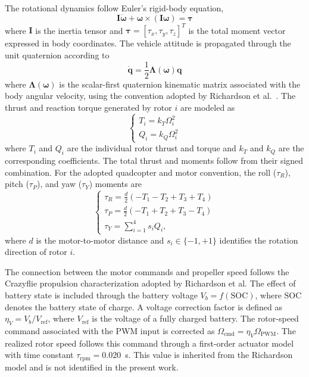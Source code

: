\documentclass[journal]{IEEEtran}
\begin{document}
The rotational dynamics follow Euler's rigid-body equation,
%
\begin{equation}
\mathbf{I}\dot{\boldsymbol{\omega}}
+
\boldsymbol{\omega}
\times
(\mathbf{I}\boldsymbol{\omega})
= \boldsymbol{\tau}
\label{eq_vehicle_rot}
\end{equation}
where $\mathbf{I}$ is the inertia tensor and $\boldsymbol{\tau}=[\tau_x,\tau_y,\tau_z]^T$ is the total moment vector expressed in body coordinates.
%
The vehicle attitude is propagated through the unit quaternion according to
%
\begin{equation}
\dot{\mathbf q} = \frac{1}{2}
\mathbf{\Lambda}(\boldsymbol{\omega})\mathbf q
\label{eq_vehicle_attitude}
\end{equation}
where $\mathbf{\Lambda}(\boldsymbol{\omega})$ is the scalar-first quaternion kinematic matrix associated with the body angular velocity, using the convention adopted by Richardson et al.~\cite{Richardson2025}.
%
The thrust and reaction torque generated by rotor $i$ are modeled as
%
\begin{equation}
\begin{cases}
{T_i=k_T\Omega_i^2}\\
{Q_i=k_Q\Omega_i^2}
\end{cases}
\label{eq_T_and_Q}
\end{equation}
where $T_i$ and $Q_i$ are the individual rotor thrust and torque and $k_T$ and $k_Q$ are the corresponding coefficients. The total thrust and moments follow from their signed combination.
%
For the adopted quadcopter and motor convention, the roll ($\tau_R$), pitch ($\tau_P$), and yaw ($\tau_Y$) moments are
%
\begin{equation}
\begin{cases}
{\tau_R=
\frac{d}{2}
\left(
-T_1-T_2+T_3+T_4
\right)}\\
{\tau_P=
\frac{d}{2}
\left(
-T_1+T_2+T_3-T_4
\right)}\\
{\tau_Y=
\sum_{i=1}^{4}s_iQ_i,}
\end{cases}
\label{eq_RP_moments}
\end{equation}
where $d$ is the motor-to-motor distance and $s_i\in\{-1,+1\}$ identifies the rotation direction of rotor $i$.
%

The connection between the motor commands and propeller speed follows the Crazyflie propulsion characterization adopted by Richardson et al. The effect of battery state is included through the battery voltage $V_b=f(\mathrm{SOC})$, where $\mathrm{SOC}$ denotes the battery state of charge. A voltage correction factor is defined as $\eta_V=V_b/V_{\mathrm{ref}}$, where $V_{\mathrm{ref}}$ is the voltage of a fully charged battery. The rotor-speed command associated with the PWM input is corrected as $\Omega_{\mathrm{cmd}}=\eta_V\Omega_{\mathrm{PWM}}$. The realized rotor speed follows this command through a first-order actuator model with time constant $\tau_{\mathrm{rpm}}=0.020$~s. This value is inherited from the Richardson model and is not identified in the present work.
\end{document}
